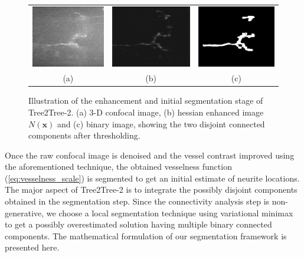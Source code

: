 \begin{figure}[thb]
\centering
\begin{tabular}{ccc}
\includegraphics[width=0.3\linewidth, height = 0.25\linewidth]{./images/ch3/raw_demo}	&
\includegraphics[width=0.3\linewidth, height = 0.25\linewidth]{./images/ch3/hessian_demo}	&
\includegraphics[width=0.3\linewidth, height = 0.25\linewidth]{./images/ch3/binary_demo}	\\
\scriptsize (a) & \scriptsize (b) & \scriptsize (c)
\end{tabular}
\caption[Tree2Tree-2: Initial segmentation]{Illustration of the enhancement and initial segmentation stage of Tree2Tree-2. (a) 3-D confocal image, (b) hessian enhanced image $N(\textbf{x})$ and (c) binary image, showing the two disjoint connected components after thresholding.}
\label{fig:T2T_enhance}
\end{figure}
Once the raw confocal image is denoised and the vessel contrast improved using the aforementioned technique, the obtained vesselness function (\ref{eq:vesselness_scale}) is segmented to get an initial estimate of neurite locations. The major aspect of Tree2Tree-2 is to integrate the possibly disjoint components obtained in the segmentation step. Since the connectivity analysis step is non-generative, we choose a local segmentation technique using variational minimax\cite{saha_minimax} to get a possibly overestimated solution having multiple binary connected components. The mathematical formulation of our segmentation framework is presented here.

